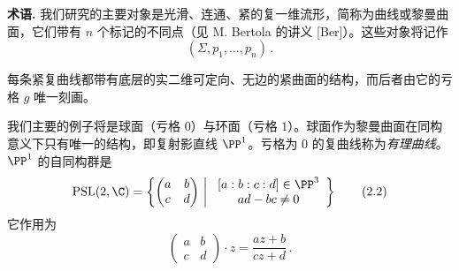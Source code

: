 
\noindent\textbf{术语.} 我们研究的主要对象是光滑、连通、紧的复一维流形，简称为曲线或黎曼曲面，它们带有 $n$ 个标记的不同点（见 M. Bertola 的讲义 [Ber]）。这些对象将记作
\begin{equation}
  (\Sigma,p_1,\dots,p_n)\,.
  \tag{2.1}
\end{equation}

每条紧复曲线都带有底层的实二维可定向、无边的紧曲面的结构，而后者由它的亏格 $g$ 唯一刻画。

我们主要的例子将是球面（亏格 $0$）与环面（亏格 $1$）。球面作为黎曼曲面在同构意义下只有唯一的结构，即复射影直线 $\PP^1$。亏格为 $0$ 的复曲线称为\emph{有理曲线}。$\PP^1$ 的自同构群是
\begin{equation}
  \mathrm{PSL}(2,\C)=\left\{\begin{pmatrix}a&b\\c&d\end{pmatrix}\ \middle|\
    \begin{array}{c}[a:b:c:d]\in\PP^3\\ ad-bc\ne 0\end{array}\right\}
  \tag{2.2}
\end{equation}
它作用为
\begin{equation}
  \begin{pmatrix}a&b\\c&d\end{pmatrix}\!\cdot z=\frac{az+b}{cz+d}\,.
  \tag{2.3}
\end{equation}

